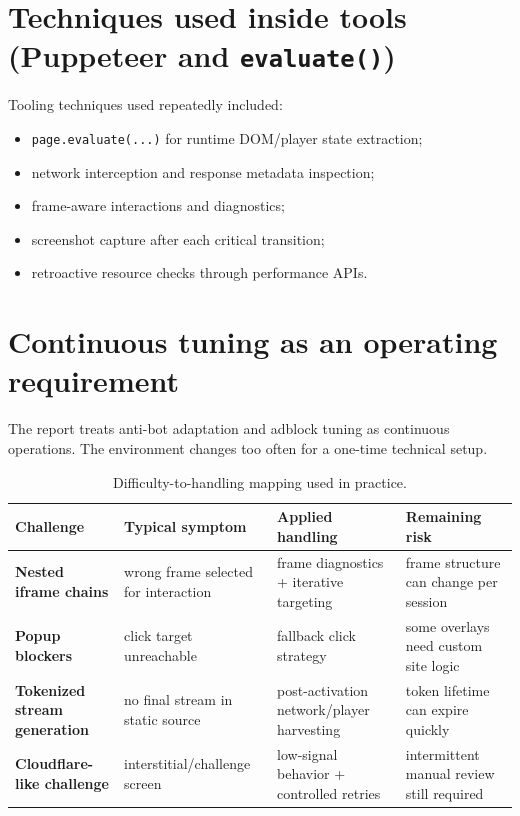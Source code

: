 \section{Techniques used inside tools (Puppeteer and \texttt{evaluate()})}

Tooling techniques used repeatedly included:

\begin{itemize}
  \item \texttt{page.evaluate(...)} for runtime DOM/player state extraction;
  \item network interception and response metadata inspection;
  \item frame-aware interactions and diagnostics;
  \item screenshot capture after each critical transition;
  \item retroactive resource checks through performance APIs.
\end{itemize}

\section{Continuous tuning as an operating requirement}

The report treats anti-bot adaptation and adblock tuning as continuous operations. The
environment changes too often for a one-time technical setup.

\begin{table}[H]
\centering
\begin{tabularx}{\textwidth}{>{\raggedright\arraybackslash\bfseries}p{2.8cm}
                              >{\raggedright\arraybackslash}X
                              >{\raggedright\arraybackslash}X
                              >{\raggedright\arraybackslash}X}
\toprule
\rowcolor{accent!8}
Challenge & Typical symptom & Applied handling & Remaining risk \\
\midrule
Nested iframe chains & wrong frame selected for interaction & frame diagnostics +
  iterative targeting & frame structure can change per session \\
Popup blockers & click target unreachable & fallback click strategy & some overlays
  need custom site logic \\
Tokenized stream generation & no final stream in static source & post-activation
  network/player harvesting & token lifetime can expire quickly \\
Cloudflare-like challenge & interstitial/challenge screen & low-signal behavior +
  controlled retries & intermittent manual review still required \\
\bottomrule
\end{tabularx}
\caption{Difficulty-to-handling mapping used in practice.}
\label{tab:difficulty-handling}
\end{table}

